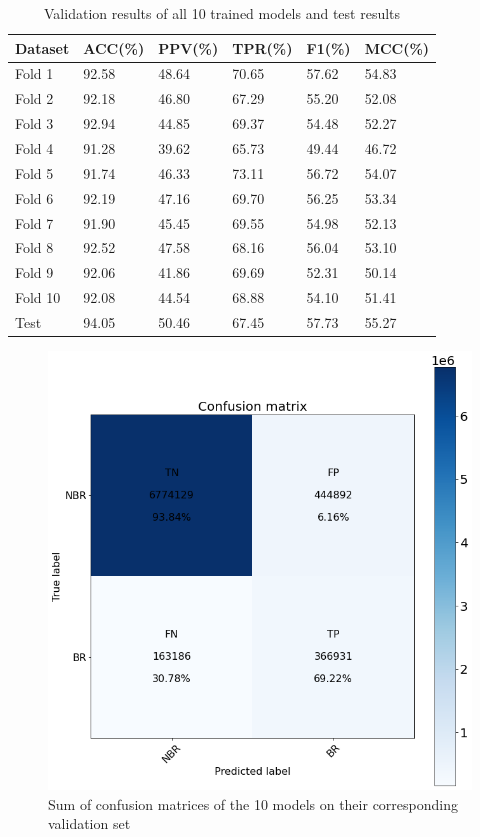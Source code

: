 \documentclass[journal=jacsat,manuscript=article]{achemso}
\begin{document}
\begin{table}
    \centering
    \begin{tabular}{| P{2cm} | P{2cm} | P{2cm} | P{2cm} | P{2cm} | P{2cm} |}
        \hline
        Dataset & ACC(\%) & PPV(\%) & TPR(\%) & F1(\%) & MCC(\%) \\
        \hline
        Fold 1  & 92.58   & 48.64   & 70.65   & 57.62  & 54.83   \\
        Fold 2  & 92.18   & 46.80   & 67.29   & 55.20  & 52.08   \\
        Fold 3  & 92.94   & 44.85   & 69.37   & 54.48  & 52.27   \\
        Fold 4  & 91.28   & 39.62   & 65.73   & 49.44  & 46.72   \\
        Fold 5  & 91.74   & 46.33   & 73.11   & 56.72  & 54.07   \\
        Fold 6  & 92.19   & 47.16   & 69.70   & 56.25  & 53.34   \\
        Fold 7  & 91.90   & 45.45   & 69.55   & 54.98  & 52.13   \\
        Fold 8  & 92.52   & 47.58   & 68.16   & 56.04  & 53.10   \\
        Fold 9  & 92.06   & 41.86   & 69.69   & 52.31  & 50.14   \\
        Fold 10 & 92.08   & 44.54   & 68.88   & 54.10  & 51.41   \\
        Test    & 94.05   & 50.46   & 67.45   & 57.73  & 55.27   \\
        \hline
    \end{tabular}
    \caption{\label{tab:results} Validation results of all 10 trained models and test results}
\end{table}

\begin{figure}
    \centering
    \noindent\includegraphics[scale=0.4]{valid_cm.png}
    \caption{\centering Sum of confusion matrices of the 10 models on their corresponding validation set}
    \label{fig:valid_cm}
\end{figure}
\end{document}
